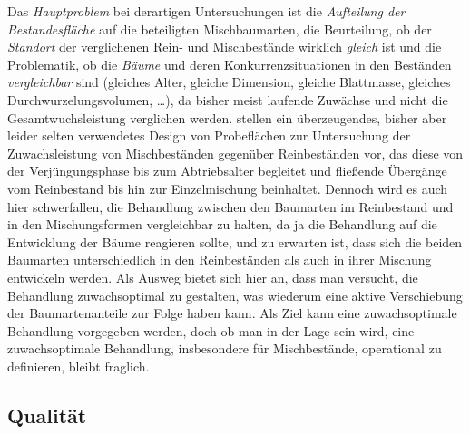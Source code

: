 \documentclass[twocolumn, paper=a4, fontsize=10pt, bibliography=totoc, index=totoc]{scrartcl}
\begin{document}
Das \emph{Hauptproblem} bei derartigen Untersuchungen ist die \emph{Aufteilung
der Bestandesfläche} auf die beteiligten Mischbaumarten, die Beurteilung, ob der
\emph{Standort} der verglichenen Rein- und Mischbestände wirklich \emph{gleich}
ist und die Problematik, ob die \emph{Bäume} und deren Konkurrenzsituationen in
den Beständen \emph{vergleichbar} sind (gleiches Alter, gleiche Dimension,
gleiche Blattmasse, gleiches Durchwurzelungsvolumen, \dots), da bisher meist
laufende Zuwächse und nicht die Gesamtwuchsleistung verglichen werden.
\citet{vanclay2013mixedSpecies,vanclay2021ExperimentsMixedSpecies}
stellen ein überzeugendes, bisher aber leider selten verwendetes Design von
Probeflächen zur Untersuchung der Zuwachsleistung von Mischbeständen gegenüber Reinbeständen vor, das diese von der Verjüngungsphase bis zum Abtriebsalter begleitet und fließende Übergänge vom Reinbestand bis hin zur Einzelmischung beinhaltet. Dennoch wird es auch hier schwerfallen, die Behandlung zwischen den Baumarten im Reinbestand und in den Mischungsformen vergleichbar zu halten, da ja die Behandlung auf die Entwicklung der Bäume reagieren sollte, und zu erwarten ist, dass sich die beiden Baumarten unterschiedlich in den Reinbeständen als auch in ihrer Mischung entwickeln werden. Als Ausweg bietet sich hier an, dass man versucht, die Behandlung zuwachsoptimal zu gestalten, was wiederum eine aktive Verschiebung der Baumartenanteile zur Folge haben kann. Als Ziel kann eine zuwachsoptimale Behandlung vorgegeben werden, doch ob man in der Lage sein wird, eine zuwachsoptimale Behandlung, insbesondere für Mischbestände, operational zu definieren, bleibt fraglich.

\subsection{Qualität}
\label{ssec:qualitaet}
\end{document}

